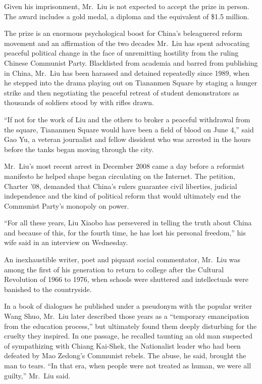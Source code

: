 ﻿\documentclass[12pt]{article}
\begin{document}
Given his imprisonment, Mr.~Liu is not expected to accept the prize in person. The award includes a
gold medal, a diploma and the equivalent of \$1.5 million.

The prize is an enormous psychological boost for China's beleaguered reform movement and an
affirmation of the two decades Mr.~Liu has spent advocating peaceful political change in the face of
unremitting hostility from the ruling Chinese Communist Party. Blacklisted from academia and barred
from publishing in China, Mr.~Liu has been harassed and detained repeatedly since 1989, when he
stepped into the drama playing out on Tiananmen Square by staging a hunger strike and then
negotiating the peaceful retreat of student demonstrators as thousands of soldiers stood by with
rifles drawn.

``If not for the work of Liu and the others to broker a peaceful withdrawal from the square,
Tiananmen Square would have been a field of blood on June 4,'' said Gao Yu, a veteran journalist and
fellow dissident who was arrested in the hours before the tanks began moving through the city.

Mr.~Liu's most recent arrest in December 2008 came a day before a reformist manifesto he helped
shape began circulating on the Internet. The petition, Charter '08, demanded that China's rulers
guarantee civil liberties, judicial independence and the kind of political reform that would
ultimately end the Communist Party's monopoly on power.

``For all these years, Liu Xiaobo has persevered in telling the truth about China and because of
this, for the fourth time, he has lost his personal freedom,'' his wife said in an interview on
Wednesday.

An inexhaustible writer, poet and piquant social commentator, Mr.~Liu was among the first of his
generation to return to college after the Cultural Revolution of 1966 to 1976, when schools were
shuttered and intellectuals were banished to the countryside.

In a book of dialogues he published under a pseudonym with the popular writer Wang Shuo, Mr.~Liu
later described those years as a ``temporary emancipation from the education process,'' but
ultimately found them deeply disturbing for the cruelty they inspired. In one passage, he recalled
taunting an old man suspected of sympathizing with Chiang Kai-Shek, the Nationalist leader who had
been defeated by Mao Zedong's Communist rebels. The abuse, he said, brought the man to tears. ``In
that era, when people were not treated as human, we were all guilty,'' Mr.~Liu said.
\end{document}
